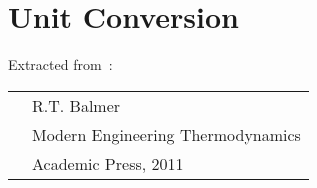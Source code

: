 
\chapter{Unit Conversion}

Extracted from~\cite{Balmer_Book}:\\
  \begin{tabular}{c l}
     \hspace{1cm} & R.T. Balmer \\
                  & Modern Engineering Thermodynamics \\
                  & Academic Press, 2011  \\
  \end{tabular}

  
